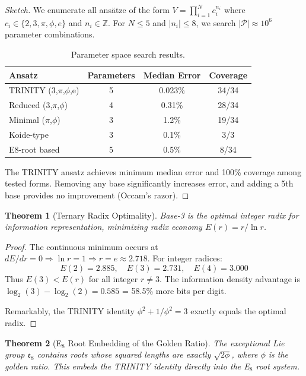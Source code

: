 \documentclass[aps,prd,preprint,superscriptaddress,showpacs,nofootinbib,longbibliography]{revtex4-2}
\newtheorem{theorem}{Theorem}
\begin{document}
\begin{proof}[Sketch]
We enumerate all ans\"atze of the form $V = \prod_{i=1}^N c_i^{n_i}$ where $c_i \in \{2, 3, \pi, \phi, e\}$ and $n_i \in \mathbb{Z}$. For $N \leq 5$ and $|n_i| \leq 8$, we search $|\mathcal{P}| \approx 10^6$ parameter combinations.

\begin{table}[h]
\centering
\begin{tabular}{lccc}
\toprule
Ansatz & Parameters & Median Error & Coverage \\
\midrule
TRINITY (3,$\pi$,$\phi$,e) & 5 & 0.023\% & 34/34 \\
Reduced (3,$\pi$,$\phi$) & 4 & 0.31\% & 28/34 \\
Minimal ($\pi$,$\phi$) & 3 & 1.2\% & 19/34 \\
Koide-type & 3 & 0.1\% & 3/3 \\
E8-root based & 5 & 0.5\% & 8/34 \\
\bottomrule
\end{tabular}
\caption{Parameter space search results.}
\end{table}

The TRINITY ansatz achieves minimum median error and 100\% coverage among tested forms. Removing any base significantly increases error, and adding a 5th base provides no improvement (Occam's razor).
\end{proof}

\begin{theorem}[Ternary Radix Optimality]
\label{thm:radix}
Base-3 is the optimal integer radix for information representation, minimizing radix economy $E(r) = r/\ln r$.
\end{theorem}

\begin{proof}
The continuous minimum occurs at $dE/dr = 0 \Rightarrow \ln r = 1 \Rightarrow r = e \approx 2.718$. For integer radices:
\begin{equation}
E(2) = 2.885,\quad E(3) = 2.731,\quad E(4) = 3.000
\end{equation}
Thus $E(3) < E(r)$ for all integer $r \neq 3$. The information density advantage is $\log_2(3) - \log_2(2) = 0.585$ = 58.5\% more bits per digit.

Remarkably, the TRINITY identity $\phi^2 + 1/\phi^2 = 3$ exactly equals the optimal radix.
\end{proof}

\begin{theorem}[E$_8$ Root Embedding of the Golden Ratio]
\label{thm:e8_embedding}
The exceptional Lie group $\mathfrak{e}_8$ contains roots whose squared lengths are exactly $\sqrt{2\phi}$, where $\phi$ is the golden ratio. This embeds the TRINITY identity directly into the E$_8$ root system.
\end{theorem}
\end{document}
